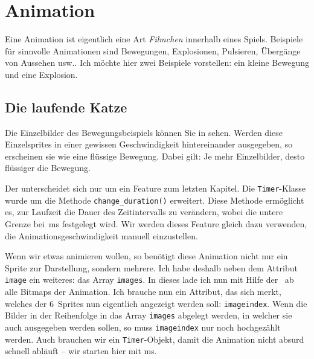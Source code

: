 \newpage
\section{Animation}
Eine Animation ist eigentlich eine Art \emph{Filmchen} innerhalb eines Spiels. Beispiele für sinnvolle Animationen sind Bewegungen, Explosionen, Pulsieren, Übergänge von Aussehen usw.. Ich möchte hier zwei Beispiele vorstellen: ein kleine Bewegung und eine Explosion.

\subsection{Die laufende Katze}


Die Einzelbilder des Bewegungsbeispiels können Sie in  sehen. Werden diese Einzelsprites in einer gewissen Geschwindigkeit hintereinander ausgegeben, so erscheinen sie wie eine flüssige Bewegung. Dabei gilt: Je mehr Einzelbilder, desto flüssiger die Bewegung.

Der  unterscheidet sich nur um ein Feature zum letzten Kapitel. Die \texttt{Timer}-Klasse wurde um die Methode \texttt{change\_duration()} erweitert. Diese Methode ermöglicht es, zur Laufzeit die Dauer des Zeitintervalls zu verändern, wobei die untere Grenze bei~\unit[0]{ms} festgelegt wird. Wir werden dieses Feature gleich dazu verwenden, die Animationsgeschwindigkeit manuell einzustellen. 


Wenn wir etwas animieren wollen, so benötigt diese Animation nicht nur ein Sprite zur Darstellung, sondern mehrere. Ich habe deshalb neben dem Attribut \texttt{image} ein weiteres: das Array \texttt{images}. In dieses lade ich nun mit Hilfe der \forSchleife\ ab  alle Bitmaps der Animation. Ich brauche nun ein Attribut, das sich merkt, welches der 6~Sprites nun eigentlich angezeigt werden soll: \texttt{imageindex}. Wenn die Bilder in der Reihenfolge in das Array \texttt{images} abgelegt werden, in welcher sie auch ausgegeben werden sollen, so muss \texttt{imageindex} nur noch hochgezählt werden. Auch brauchen wir ein \texttt{Timer}-Objekt, damit die Animation nicht absurd schnell abläuft -- wir starten hier mit \unit[100]{ms}.

